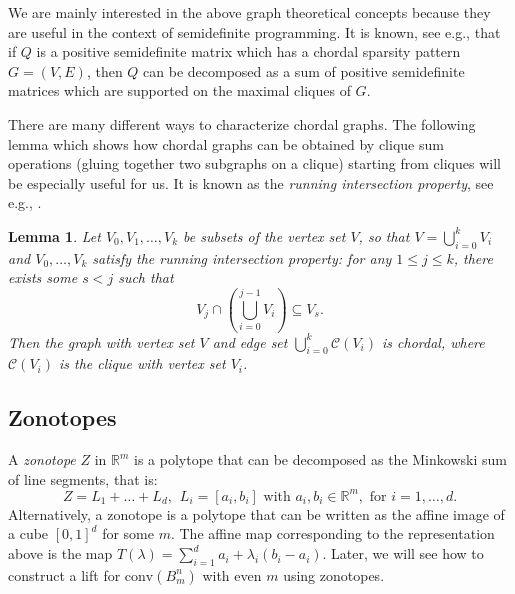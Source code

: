 \documentclass{article}
\newcommand{\RR}{\mathbb{R}}
\newtheorem{lemma}{Lemma}
\theoremstyle{definition}
\newcommand{\conv}{\text{conv}}
\begin{document}
We are mainly interested in the above graph theoretical concepts because they are useful in the context of semidefinite programming. It is known, see e.g., \cite[Theorem 2.3]{agler1988positive} that if $Q$ is a positive semidefinite matrix which has a chordal sparsity pattern $G=(V,E)$, then $Q$ can be decomposed as a sum of positive semidefinite matrices which are supported on the maximal cliques of $G$.

There are many different ways to characterize chordal graphs. The following lemma which shows how chordal graphs can be obtained by clique sum operations (gluing together two subgraphs on a clique) starting from cliques will be especially useful for us. It is known as the \emph{running intersection property}, see e.g., \cite{lasserre2006convergent}. 

\begin{lemma}\label{lem:running_intersection}
    Let $V_0,V_1,\ldots,V_k$ be subsets of the vertex set $V$, so that $V=\bigcup_{i=0}^k V_i$ and $V_0,\ldots,V_k$ satisfy the running intersection property: for any $1\le j\le k$, there exists some $s<j$ such that
    \[
    V_j\cap\left(\bigcup_{i=0}^{j-1}V_i\right)\subseteq V_s. 
    \]
    Then the graph with vertex set $V$ and edge set $\bigcup_{i=0}^k \mathcal{C}(V_i)$ is chordal, where $\mathcal{C}(V_i)$ is the clique with vertex set $V_i$. 
\end{lemma}

\subsection{Zonotopes}

A \emph{zonotope} $Z$ in $\RR^m$ is a polytope that can be decomposed as the Minkowski sum of line segments, that is: 
\begin{equation*}
    Z = L_1+\dots+L_d , \hspace{5pt} L_i = [a_i,b_i] \text{ with } a_i,b_i \in \RR^m, \text{ for } i=1,\dots,d.
\end{equation*}
Alternatively, a zonotope is a polytope that can be written as the affine image of a cube $[0,1]^d$ for some $m$. The affine map corresponding to the representation above is the map $T(\lambda) = \sum_{i=1}^d a_i + \lambda_i (b_i - a_i)$.
Later, we will see how to construct a lift for $\conv(B_m^n)$ with even $m$ using zonotopes. 
\end{document}
